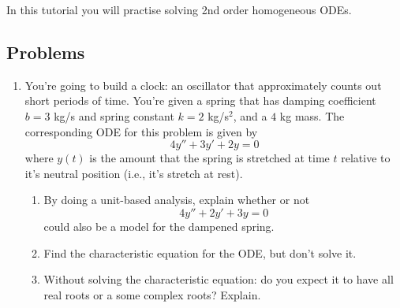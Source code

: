 \begin{objectives}
	In this tutorial you will practise solving 2nd order homogeneous ODEs.
\end{objectives}

\vspace{-.5em}
\subsection*{Problems}
\vspace{-.5em}






\begin{enumerate}


    \item You're going to build a clock: an oscillator that approximately counts out short periods of time.
    You're given a spring that has damping coefficient $b=3$ kg/s and spring constant $k=2$ kg/s$^2$, and a $4$ kg mass. The corresponding ODE for this problem is given by
    \[
        4y'' + 3y' + 2y = 0
    \]
    where $y(t)$ is the amount that the spring is stretched  at time $t$ relative to it's neutral position (i.e., it's stretch at rest).

    \begin{enumerate}
        \item By doing a unit-based analysis, explain whether or not 
        \[
            4y''+2y'+3y=0
        \]
        could also be a model for the dampened spring.

        \item Find the characteristic equation for the ODE, but don't solve it.

        \item Without solving the characteristic equation: do you expect it to have all real roots or a some complex roots? Explain.


\end{enumerate}
\end{enumerate}
